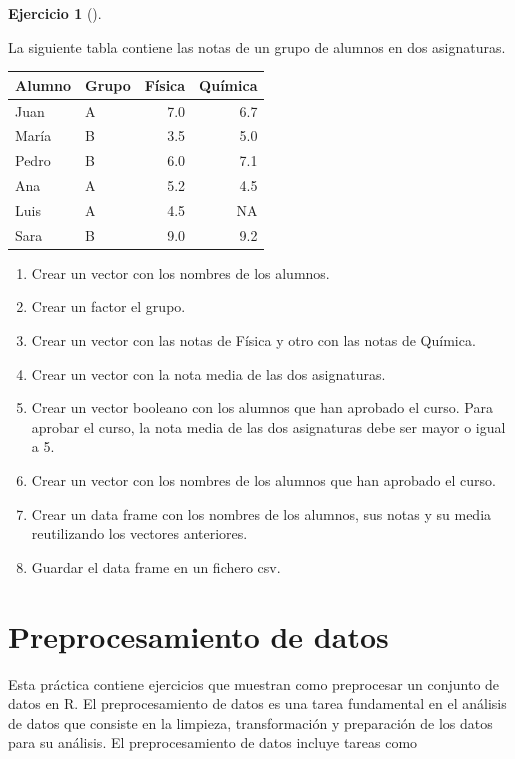 \documentclass[
  a4paper,
]{scrreport}
\theoremstyle{definition}
\newtheorem{exercise}{Ejercicio}[chapter]
\theoremstyle{remark}
\begin{document}
\begin{exercise}[]\protect\hypertarget{exr-vectores-2}{}\label{exr-vectores-2}

La siguiente tabla contiene las notas de un grupo de alumnos en dos
asignaturas.

\begin{longtable}[]{@{}llrr@{}}
\toprule\noalign{}
Alumno & Grupo & Física & Química \\
\midrule\noalign{}
\endhead
\bottomrule\noalign{}
\endlastfoot
Juan & A & 7.0 & 6.7 \\
María & B & 3.5 & 5.0 \\
Pedro & B & 6.0 & 7.1 \\
Ana & A & 5.2 & 4.5 \\
Luis & A & 4.5 & NA \\
Sara & B & 9.0 & 9.2 \\
\end{longtable}

\begin{enumerate}
\def\labelenumi{\alph{enumi}.}
\item
  Crear un vector con los nombres de los alumnos.
\item
  Crear un factor el grupo.
\item
  Crear un vector con las notas de Física y otro con las notas de
  Química.
\item
  Crear un vector con la nota media de las dos asignaturas.
\item
  Crear un vector booleano con los alumnos que han aprobado el curso.
  Para aprobar el curso, la nota media de las dos asignaturas debe ser
  mayor o igual a 5.
\item
  Crear un vector con los nombres de los alumnos que han aprobado el
  curso.
\item
  Crear un data frame con los nombres de los alumnos, sus notas y su
  media reutilizando los vectores anteriores.
\item
  Guardar el data frame en un fichero csv.
\end{enumerate}

\end{exercise}


\chapter{Preprocesamiento de datos}\label{preprocesamiento-de-datos}

Esta práctica contiene ejercicios que muestran como preprocesar un
conjunto de datos en R. El preprocesamiento de datos es una tarea
fundamental en el análisis de datos que consiste en la limpieza,
transformación y preparación de los datos para su análisis. El
preprocesamiento de datos incluye tareas como
\end{document}
